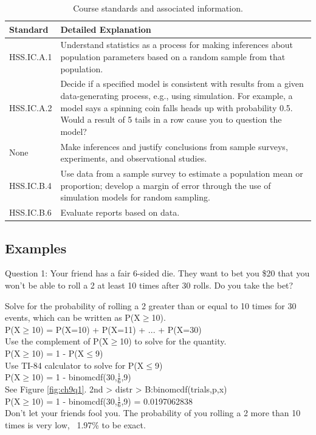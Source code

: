 \documentclass[12pt, oneside]{book}
\begin{document}
\begin{table}[h]
    \centering
    \caption{Course standards and associated information.}
    \vspace{0.3cm} %
    \begin{tabularx}{\textwidth}{l X} %
        \toprule
        \textbf{Standard} & \textbf{Detailed Explanation} \\
        \midrule
        HSS.IC.A.1 & Understand statistics as a process for making inferences about population parameters based on a random sample from that population. \\
        HSS.IC.A.2 & Decide if a specified model is consistent with results from a given data-generating process, e.g., using simulation. For example, a model says a spinning coin falls heads up with probability 0.5. Would a result of 5 tails in a row cause you to question the model? \\
        None & Make inferences and justify conclusions from sample surveys, experiments, and observational studies. \\
        HSS.IC.B.4 & Use data from a sample survey to estimate a population mean or proportion; develop a margin of error through the use of simulation models for random sampling. \\
        HSS.IC.B.6 & Evaluate reports based on data. \\
        \bottomrule
    \end{tabularx}
\end{table}

\subsection{Examples}
Question 1: Your friend has a fair 6-sided die. They want to bet you \$20 that you won't be able to roll a 2 at least 10 times after 30 rolls. Do you take the bet?
\begin{center}    
    Solve for the probability of rolling a 2 greater than or equal to 10 times for 30 events, which can be written as P(X$\geq$10). \\
    P(X$\geq$10) = P(X=10) + P(X=11) + ... + P(X=30) \\
    Use the complement of P(X$\geq$10) to solve for the quantity. \\ 
    P(X$\geq$10) = 1 - P(X$\leq$9) \\
    Use TI-84 calculator to solve for P(X$\leq$9) \\
    P(X$\geq$10) = 1 - binomcdf(30,$\frac{1}{6}$,9) \\
     See Figure \ref{fig:ch9q1}.  2nd > distr > B:binomcdf(trials,p,x) \\
    P(X$\geq$10) = 1 - binomcdf(30,$\frac{1}{6}$,9) = 0.0197062838 \\
     Don't let your friends fool you. The probability of you rolling a 2 more than 10 times is very low, ~1.97\% to be exact. \\
\end{center}
\end{document}
